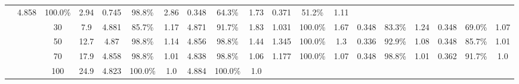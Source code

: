 \documentclass[letterpaper]{article}
\begin{document}
\begin{table*}[]
\begin{tabular}{|c|c|cc|ccc|ccc|ccc|ccc|ccc|}
		& 4.858 & 100.0\% & 2.94 	 

		& 0.745 & 98.8\% & 2.86 	 

		& 0.348 & 64.3\% & 1.73 	 

		& 0.371 & 51.2\% & 1.11 	 

	\\ & & 30	 & 7.9

		& 4.881 & 85.7\% & 1.17 	 

		& 4.871 & 91.7\% & 1.83 	 

		& 1.031 & 100.0\% & 1.67 	 

		& 0.348 & 83.3\% & 1.24 	 

		& 0.348 & 69.0\% & 1.07 	 

	\\ & & 50	 & 12.7

		& 4.87 & 98.8\% & 1.14 	 

		& 4.856 & 98.8\% & 1.44 	 

		& 1.345 & 100.0\% & 1.3 	 

		& 0.336 & 92.9\% & 1.08 	 

		& 0.348 & 85.7\% & 1.01 	 

	\\ & & 70	 & 17.9

		& 4.858 & 98.8\% & 1.01 	 

		& 4.838 & 98.8\% & 1.06 	 

		& 1.177 & 100.0\% & 1.07 	 

		& 0.348 & 98.8\% & 1.01 	 

		& 0.362 & 91.7\% & 1.0 	 

	\\ & & 100	 & 24.9

		& 4.823 & 100.0\% & 1.0 	 

		& 4.884 & 100.0\% & 1.0 	 


\end{tabular}
\end{table*}
\end{document}
